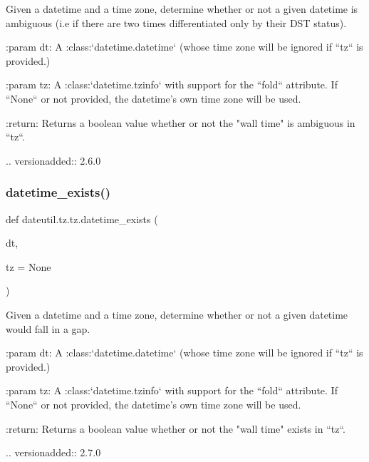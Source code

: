 \begin{DoxyVerb}Given a datetime and a time zone, determine whether or not a given datetime
is ambiguous (i.e if there are two times differentiated only by their DST
status).

:param dt:
    A :class:`datetime.datetime` (whose time zone will be ignored if ``tz``
    is provided.)

:param tz:
    A :class:`datetime.tzinfo` with support for the ``fold`` attribute. If
    ``None`` or not provided, the datetime's own time zone will be used.

:return:
    Returns a boolean value whether or not the "wall time" is ambiguous in
    ``tz``.

.. versionadded:: 2.6.0
\end{DoxyVerb}
 \mbox{\label{namespacedateutil_1_1tz_1_1tz_a4ba2e53b6154f1c008208a7e8b42bfde}} 
\subsubsection{\texorpdfstring{datetime\+\_\+exists()}{datetime\_exists()}}
{\footnotesize\ttfamily def dateutil.\+tz.\+tz.\+datetime\+\_\+exists (\begin{DoxyParamCaption}\item[{}]{dt,  }\item[{}]{tz = {\ttfamily None} }\end{DoxyParamCaption})}

\begin{DoxyVerb}Given a datetime and a time zone, determine whether or not a given datetime
would fall in a gap.

:param dt:
    A :class:`datetime.datetime` (whose time zone will be ignored if ``tz``
    is provided.)

:param tz:
    A :class:`datetime.tzinfo` with support for the ``fold`` attribute. If
    ``None`` or not provided, the datetime's own time zone will be used.

:return:
    Returns a boolean value whether or not the "wall time" exists in
    ``tz``.

.. versionadded:: 2.7.0
\end{DoxyVerb}
 \mbox{\label{namespacedateutil_1_1tz_1_1tz_a94ecc4305612c58567e0037602edd414}} 
